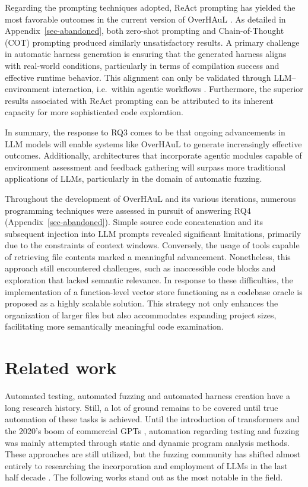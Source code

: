 \documentclass[
  a4paper,
]{scrreprt}
\theoremstyle{definition}
\theoremstyle{remark}
\begin{document}
Regarding the prompting techniques adopted, ReAct prompting has yielded
the most favorable outcomes in the current version of OverHAuL
\autocite{reAct}. As detailed in Appendix~\ref{sec-abandoned}, both
zero-shot prompting and Chain-of-Thought (COT) prompting
\autocite{chainofthought} produced similarly unsatisfactory results. A
primary challenge in automatic harness generation is ensuring that the
generated harness aligns with real-world conditions, particularly in
terms of compilation success and effective runtime behavior. This
alignment can only be validated through LLM--environment interaction,
i.e.~within agentic workflows \autocite{giannone2025}. Furthermore, the
superior results associated with ReAct prompting can be attributed to
its inherent capacity for more sophisticated code exploration.

In summary, the response to RQ3 comes to be that ongoing advancements in
LLM models will enable systems like OverHAuL to generate increasingly
effective outcomes. Additionally, architectures that incorporate agentic
modules capable of environment assessment and feedback gathering will
surpass more traditional applications of LLMs, particularly in the
domain of automatic fuzzing.

Throughout the development of OverHAuL and its various iterations,
numerous programming techniques were assessed in pursuit of answering
RQ4 (Appendix~\ref{sec-abandoned}). Simple source code concatenation and
its subsequent injection into LLM prompts revealed significant
limitations, primarily due to the constraints of context windows.
Conversely, the usage of tools capable of retrieving file contents
marked a meaningful advancement. Nonetheless, this approach still
encountered challenges, such as inaccessible code blocks and exploration
that lacked semantic relevance. In response to these difficulties, the
implementation of a function-level vector store functioning as a
codebase oracle is proposed as a highly scalable solution. This strategy
not only enhances the organization of larger files but also accommodates
expanding project sizes, facilitating more semantically meaningful code
examination.


\chapter{Related work}\label{sec-related}

Automated testing, automated fuzzing and automated harness creation have
a long research history. Still, a lot of ground remains to be covered
until true automation of these tasks is achieved. Until the introduction
of transformers \autocite{vaswani2023} and the 2020's boom of commercial
GPTs \autocite{chatgpt}, automation regarding testing and fuzzing was
mainly attempted through static and dynamic program analysis methods.
These approaches are still utilized, but the fuzzing community has
shifted almost entirely to researching the incorporation and employment
of LLMs in the last half decade
\autocite{iris,sun2024,prophetfuzz,oss-fuzz-gen,green2022,utopia,fuzzgpt,titanfuzz,fuzzgen,fudge}.
The following works stand out as the most notable in the field.
\end{document}
